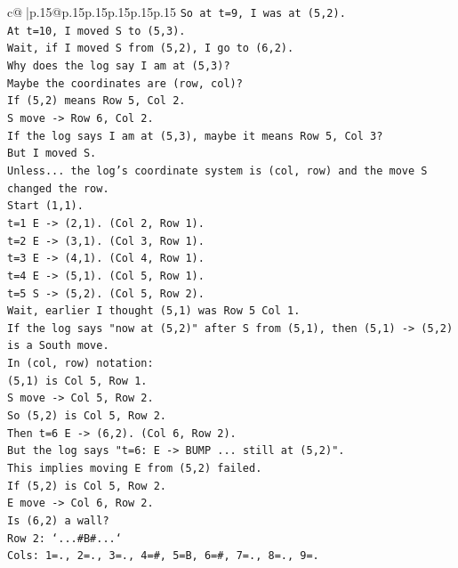 \documentclass{article}
\begin{document}
{\begin{supertabular}{c@{$\;$}|p{.15\linewidth}@{}p{.15\linewidth}p{.15\linewidth}p{.15\linewidth}p{.15\linewidth}p{.15\linewidth}}
{{{\texttt{So at t=9, I was at (5,2).} \\
\texttt{At t=10, I moved S to (5,3).} \\
\texttt{Wait, if I moved S from (5,2), I go to (6,2).} \\
\texttt{Why does the log say I am at (5,3)?} \\
\texttt{Maybe the coordinates are (row, col)?} \\
\texttt{If (5,2) means Row 5, Col 2.} \\
\texttt{S move {-}> Row 6, Col 2.} \\
\texttt{If the log says I am at (5,3), maybe it means Row 5, Col 3?} \\
\texttt{But I moved S.} \\
\texttt{Unless... the log's coordinate system is (col, row) and the move S changed the row.} \\
\texttt{Start (1,1).} \\
\texttt{t=1 E {-}> (2,1). (Col 2, Row 1).} \\
\texttt{t=2 E {-}> (3,1). (Col 3, Row 1).} \\
\texttt{t=3 E {-}> (4,1). (Col 4, Row 1).} \\
\texttt{t=4 E {-}> (5,1). (Col 5, Row 1).} \\
\texttt{t=5 S {-}> (5,2). (Col 5, Row 2).} \\
\texttt{Wait, earlier I thought (5,1) was Row 5 Col 1.} \\
\texttt{If the log says "now at (5,2)" after S from (5,1), then (5,1) {-}> (5,2) is a South move.} \\
\texttt{In (col, row) notation:} \\
\texttt{(5,1) is Col 5, Row 1.} \\
\texttt{S move {-}> Col 5, Row 2.} \\
\texttt{So (5,2) is Col 5, Row 2.} \\
\texttt{Then t=6 E {-}> (6,2). (Col 6, Row 2).} \\
\texttt{But the log says "t=6: E {-}> BUMP ... still at (5,2)".} \\
\texttt{This implies moving E from (5,2) failed.} \\
\texttt{If (5,2) is Col 5, Row 2.} \\
\texttt{E move {-}> Col 6, Row 2.} \\
\texttt{Is (6,2) a wall?} \\
\texttt{Row 2: `...\#B\#...`} \\
\texttt{Cols: 1=., 2=., 3=., 4=\#, 5=B, 6=\#, 7=., 8=., 9=.} \\
}}}
\end{supertabular}}
\end{document}

